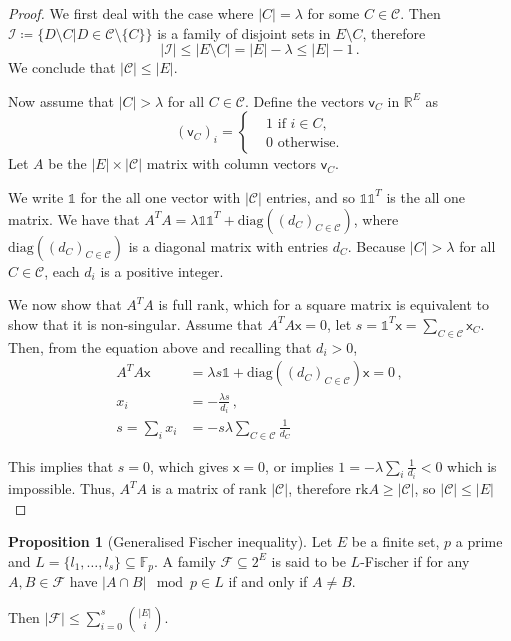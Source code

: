 \documentclass[12pt]{amsart}
\theoremstyle{definition}
\newtheorem{prop}[thm]{Proposition}
\newcommand{\R}{\mathbb{R}}
\newcommand{\F}{\mathbb{F}}
\newcommand{\one}{\mathbb{1}}
\newcommand{\CC}{\mathcal C}
\newcommand{\II}{\mathcal I}
\newcommand{\FF}{\mathcal F}
\newcommand{\vv}{\mathsf{v}}
\newcommand{\vx}{\mathsf{x}}
\newcommand{\rk}{\mathrm{rk}}
\begin{document}
\begin{proof}
We first deal with the case where $|C| = \lambda $ for some $C \in \CC$.
Then $\II \coloneqq \{ D \setminus C | D \in \CC \setminus \{C\} \}$ is a family of disjoint sets in $E \setminus C$, therefore
$$ |\II| \leq |E\setminus C| = |E| - \lambda \leq |E| - 1\, .$$
We conclude that $|\CC| \leq |E|$.

Now assume that $|C| > \lambda $ for all $C \in \CC$.
Define the vectors $\vv_C$ in $\R^E$ as 
$$ (\vv_C)_i =\begin{cases*}
      & 1 \text{ if $i \in C$,}\\
      & 0 \text{ otherwise.}
    \end{cases*} $$
Let $A$ be the $|E| \times |\CC|$ matrix with column vectors $\vv_C$.

We write $\one $ for the all one vector with $|\CC|$ entries, and so $\one \one^T$ is the all one matrix.
We have that $A^T A  = \lambda \one \one^T + \mathrm{diag}((d_C)_{C\in\CC})$, where $\mathrm{diag}((d_C)_{C\in\CC})$ is a diagonal matrix with entries $d_C$.
Because $|C| > \lambda$ for all $C \in \CC$, each $d_i$ is a positive integer.

We now show that $A^T A$ is full rank, which for a square matrix is equivalent to show that it is non-singular.
Assume that $A^T A \vx = 0$, let $s = \one^T \vx = \sum_{C \in \CC} \vx_C$.
Then, from the equation above and recalling that $d_i > 0$, 
\begin{align*}
A^T A \vx &= \lambda s \one + \mathrm{diag}((d_C)_{C\in\CC}) \vx = 0\, , \\
x_i &= -\frac{\lambda s}{d_i} \, , \\
s = \sum_i x_i &= -s \lambda \sum_{C \in \CC}\frac{1}{d_C}
\end{align*}

This implies that $s = 0$, which gives $\vx = 0$, or implies $1 = -\lambda \sum_i\frac{1}{d_i} < 0$ which is impossible.
Thus, $A^T A$ is a matrix of rank $|\CC|$, therefore $\rk A \geq |\CC|$, so $|\CC| \leq |E|$
\end{proof}


\begin{prop}[Generalised Fischer inequality]
Let $E$ be a finite set, $p$ a prime and $L = \{l_1, \ldots , l_s\} \subseteq \F_p$.
A family $\FF \subseteq 2^E$ is said to be $L$-Fischer if for any $A, B \in \FF $ have $|A\cap B| \mod p \in L$ if and only if $A \neq B$.

Then $|\FF| \leq \sum_{i=0}^s \binom{|E|}{i}$.
\end{prop}
\end{document}
